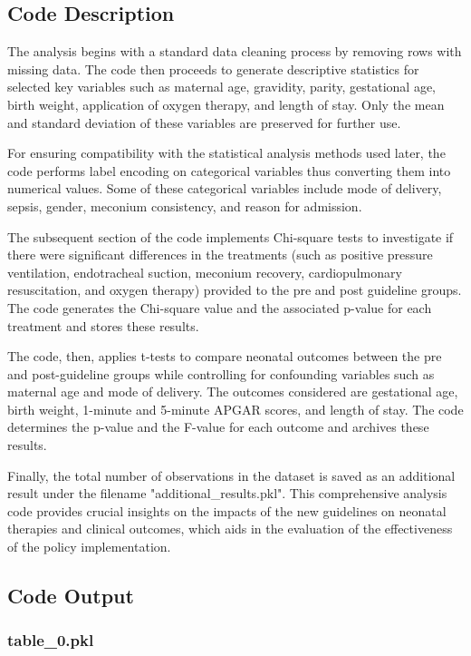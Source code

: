 \documentclass[11pt]{article}
\begin{document}
\subsection{Code Description}

The analysis begins with a standard data cleaning process by removing rows with missing data. The code then proceeds to generate descriptive statistics for selected key variables such as maternal age, gravidity, parity, gestational age, birth weight, application of oxygen therapy, and length of stay. Only the mean and standard deviation of these variables are preserved for further use.

For ensuring compatibility with the statistical analysis methods used later, the code performs label encoding on categorical variables thus converting them into numerical values. Some of these categorical variables include mode of delivery, sepsis, gender, meconium consistency, and reason for admission.

The subsequent section of the code implements Chi-square tests to investigate if there were significant differences in the treatments (such as positive pressure ventilation, endotracheal suction, meconium recovery, cardiopulmonary resuscitation, and oxygen therapy) provided to the pre and post guideline groups. The code generates the Chi-square value and the associated p-value for each treatment and stores these results.

The code, then, applies t-tests to compare neonatal outcomes between the pre and post-guideline groups while controlling for confounding variables such as maternal age and mode of delivery. The outcomes considered are gestational age, birth weight, 1-minute and 5-minute APGAR scores, and length of stay. The code determines the p-value and the F-value for each outcome and archives these results.

Finally, the total number of observations in the dataset is saved as an additional result under the filename "additional\_results.pkl". This comprehensive analysis code provides crucial insights on the impacts of the new guidelines on neonatal therapies and clinical outcomes, which aids in the evaluation of the effectiveness of the policy implementation.

\subsection{Code Output}

\subsubsection*{table\_0.pkl}
\end{document}
